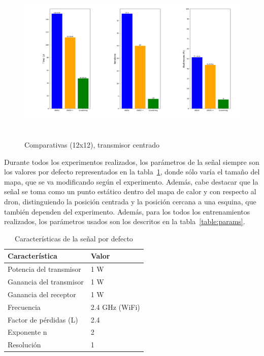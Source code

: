 \begin{figure} [tp]
    \begin{center}
    \includegraphics[height=8cm]{imagenes/cap4/18_comp_centro_12.png}
    \end{center}
    \caption[Comparativas (12x12), transmisor centrado]{Comparativas (12x12), transmisor centrado}
    \label{fig:comp_center_12}
\end{figure}

Durante todos los experimentos realizados, los parámetros de la señal siempre son los valores por defecto representados en la tabla~\ref{table:compare_graph}, donde sólo varía el tamaño del mapa, que se va modificando según el experimento. Además, cabe destacar que la señal se toma como un punto estático dentro del mapa de calor y con respecto al dron, distinguiendo la posición centrada y la posición cercana a una esquina, que también dependen del experimento. Además, para los todos los entrenamientos realizados, los parámetros usados son los descritos en la tabla~\ref{table:params}.\\

\begin{table} [t]
    \centering
    \begin{tabular}{|l|l|}
    \hline
    Característica          & Valor \\
    \hline
    Potencia del transmisor & 1 W            \\
    Ganancia del transmisor & 1 W            \\
    Ganancia del receptor   & 1 W            \\
    Frecuencia              & 2.4 GHz (WiFi) \\
    Factor de pérdidas (L)  & 2.4            \\
    Exponente n             & 2              \\
    Resolución              & 1              \\
    \hline
    \end{tabular}
    \caption[Características de la señal por defecto]{Características de la señal por defecto}
    \label{table:compare_graph}
\end{table}

